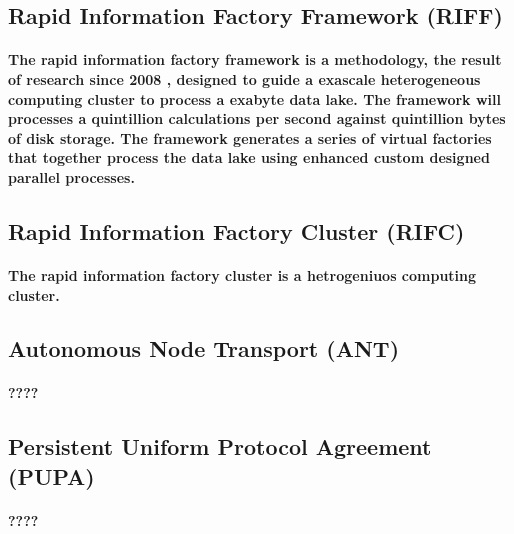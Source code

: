 \documentclass{acm_proc_article-sp}
\begin{document}
\subsection{Rapid Information Factory Framework (RIFF)}
\paragraph{The rapid information factory framework is a methodology, the result of research since 2008 , designed to guide a exascale \cite{bergman2008exascale} heterogeneous computing cluster to process a exabyte data lake. The framework will processes a quintillion calculations per second against quintillion bytes of disk storage. The framework generates a series of virtual factories that together process the data lake using enhanced custom designed parallel processes.}
\subsection{Rapid Information Factory Cluster (RIFC)}
\paragraph{The rapid information factory cluster is a hetrogeniuos computing cluster.}
\subsection{Autonomous Node Transport (ANT)}
\paragraph{????}
\subsection{Persistent Uniform Protocol Agreement (PUPA)}
\paragraph{????}


\end{document}
